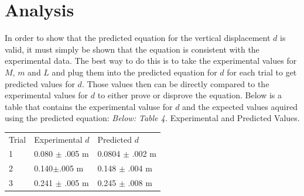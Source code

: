 \documentclass[12pt,letterpaper]{article}
\begin{document}
{{{\section{Analysis}
In order to show that the predicted equation for the vertical displacement \(d\) is valid, it must simply be shown that the equation is consistent with the experimental data. The best way to do this is to take the experimental values for \(M\), \(m\) and \(L\) and plug them into the predicted equation for \(d\) for each trial to get predicted values for \(d\). Those values then can be directly compared to the experimental values for \(d\) to either prove or disprove the equation. Below is a table that contains the experimental valuse for \(d\) and the expected values aquired using the predicted equation:  
\newline\newline
\textit{Below: Table 4.} Experimental and Predicted Values.
{\renewcommand{\arraystretch}{1.2}
\begin{table}[h]
\hspace{1.55in}
\begin{tabular}{l|l|l}
Trial \hspace{.15in}& \hspace{.15in} Experimental \(d\) \hspace{.15in}&\hspace{.15in} Predicted \(d\) \\
\hspace{.15in}1 \hspace{.15in}& \hspace{.15in} 0.080 \(\pm\) .005 m \hspace{.15in}& \hspace{.15in} 0.0804 \(\pm\) .002 m \\
\hspace{.15in}2 \hspace{.15in}& \hspace{.15in}0.140\(\pm\).005 m\hspace{.15in} &\hspace{.15in} 0.148 \(\pm\) .004 m \\
\hspace{.15in}3 \hspace{.15in}& \hspace{.15in} 0.241 \(\pm\) .005 m\hspace{.15in}& \hspace{.15in} 0.245 \(\pm\) .008 m \\                 
\end{tabular}

\end{table}}}}}
\end{document}
